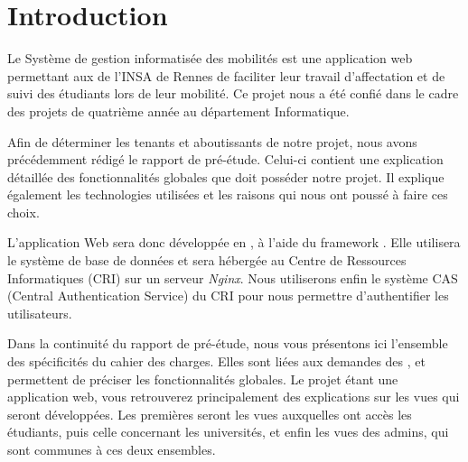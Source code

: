 \chapter*{Introduction}

Le Système de gestion informatisée des mobilités est une application web permettant aux \ris de l'INSA de Rennes de faciliter leur travail d'affectation et de suivi des étudiants lors de leur mobilité. Ce projet nous a été confié dans le cadre des projets de quatrième année au département Informatique.

\bigbreak

Afin de déterminer les tenants et aboutissants de notre projet, nous avons précédemment rédigé le rapport de pré-étude. Celui-ci contient une explication détaillée des fonctionnalités globales que doit posséder notre projet. Il explique également les technologies utilisées et les raisons qui nous ont poussé à faire ces choix. 

L'application Web sera donc développée en \php, à l'aide du framework \symfony. Elle utilisera le système de base de données \mdb et sera hébergée au Centre de Ressources Informatiques (CRI) sur un serveur \textit{Nginx}. Nous utiliserons enfin le système CAS (Central Authentication Service) du CRI pour nous permettre d'authentifier les utilisateurs.

\bigbreak

Dans la continuité du rapport de pré-étude, nous vous présentons ici l'ensemble des spécificités du cahier des charges. Elles sont liées aux demandes des \ris, et permettent de préciser les fonctionnalités globales. Le projet étant une application web, vous retrouverez principalement des explications sur les vues qui seront développées. Les premières seront les vues auxquelles ont accès les étudiants, puis celle concernant les universités, et enfin les vues des admins, qui sont communes à ces deux ensembles.